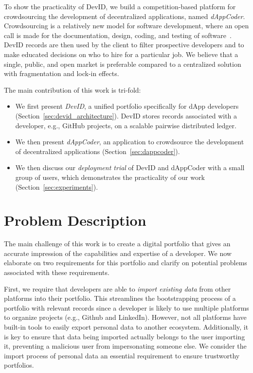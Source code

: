To show the practicality of DevID, we build a competition-based platform for crowdsourcing the development of decentralized applications, named \emph{dAppCoder}.
Crowdsourcing is a relatively new model for software development, where an open call is made for the documentation, design, coding, and testing of software~\cite{latoza2016crowdsourcing}.
DevID records are then used by the client to filter prospective developers and to make educated decisions on who to hire for a particular job.
We believe that a single, public, and open market is preferable compared to a centralized solution with fragmentation and lock-in effects.

The main contribution of this work is tri-fold:
\begin{itemize}
	\item We first present \emph{DevID}, a unified portfolio specifically for dApp developers (Section~\ref{sec:devid_architecture}). DevID stores records associated with a developer, e.g., GitHub projects, on a scalable pairwise distributed ledger.
	\item We then present \emph{dAppCoder}, an application to crowdsource the development of decentralized applications (Section~\ref{sec:dappcoder}).
	\item We then discuss our \emph{deployment trial} of DevID and dAppCoder with a small group of users, which demonstrates the practicality of our work (Section~\ref{sec:experiments}).
\end{itemize}

\section{Problem Description}
\label{sec:problem_description}
The main challenge of this work is to create a digital portfolio that gives an accurate impression of the capabilities and expertise of a developer.
We now elaborate on two requirements for this portfolio and clarify on potential problems associated with these requirements.

First, we require that developers are able to \emph{import existing data} from other platforms into their portfolio.
This streamlines the bootstrapping process of a portfolio with relevant records since a developer is likely to use multiple platforms to organize projects (e.g., Github and LinkedIn).
However, not all platforms have built-in tools to easily export personal data to another ecosystem.
Additionally, it is key to ensure that data being imported actually belongs to the user importing it, preventing a malicious user from impersonating someone else.
We consider the import process of personal data an essential requirement to ensure trustworthy portfolios.

